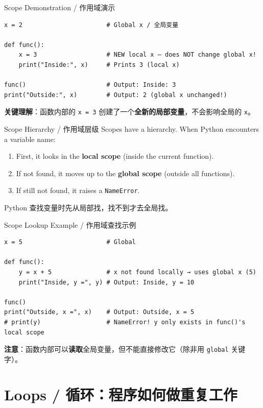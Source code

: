 \documentclass[11pt,a4paper]{article}
\begin{document}
\begin{examplebox}{Scope Demonstration / 作用域演示}
\begin{lstlisting}
x = 2                       # Global x / 全局变量

def func():
    x = 3                   # NEW local x — does NOT change global x!
    print("Inside:", x)     # Prints 3 (local x)

func()                      # Output: Inside: 3
print("Outside:", x)        # Output: 2 (global x unchanged!)
\end{lstlisting}
    \textbf{关键理解}：函数内部的 \texttt{x = 3} 创建了一个\textbf{全新的局部变量}，不会影响全局的 \texttt{x}。
\end{examplebox}

\begin{concept}{Scope Hierarchy / 作用域层级}
    Scopes have a hierarchy. When Python encounters a variable name:
    \begin{enumerate}[itemsep=0.3em]
        \item First, it looks in the \textbf{local scope} (inside the current function).
        \item If not found, it moves up to the \textbf{global scope} (outside all functions).
        \item If still not found, it raises a \texttt{NameError}.
    \end{enumerate}
    Python 查找变量时先从局部找，找不到才去全局找。
\end{concept}

\begin{examplebox}{Scope Lookup Example / 作用域查找示例}
\begin{lstlisting}
x = 5                       # Global

def func():
    y = x + 5               # x not found locally → uses global x (5)
    print("Inside, y =", y) # Output: Inside, y = 10

func()
print("Outside, x =", x)    # Output: Outside, x = 5
# print(y)                  # NameError! y only exists in func()'s local scope
\end{lstlisting}
    \textbf{注意}：函数内部可以\textbf{读取}全局变量，但不能直接修改它（除非用 \texttt{global} 关键字）。
\end{examplebox}

\section{Loops / 循环：程序如何做重复工作}
\end{document}
